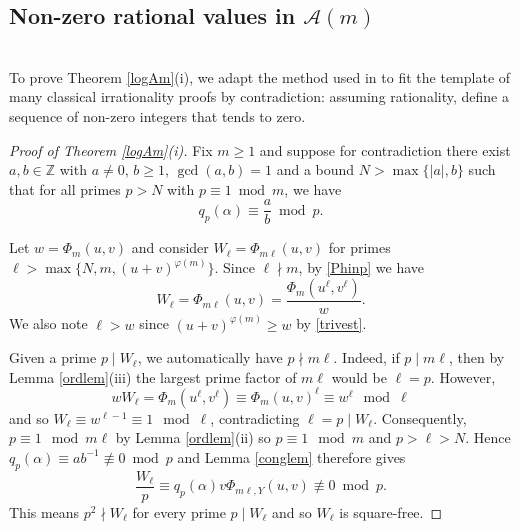 \documentclass[12pt,reqno]{amsart}
\theoremstyle{remark}
\newcommand{\cA}{\mathcal A}
\begin{document}
\subsection{Non-zero rational values in $\cA(m)$} $\,$\\[3pt]
To prove Theorem \ref{logAm}(i), we adapt the method used in \cite{MS26} to fit the template of many classical irrationality proofs by contradiction: assuming rationality, define a sequence of non-zero integers that tends to zero.
\begin{proof}[Proof of Theorem \ref{logAm}(i)] 
Fix $m\geq 1$ and suppose for contradiction there exist $a, b\in\mathbb{Z}$ with $a\neq 0$, $b\geq 1$, $\gcd(a,b)=1$ and a bound $N>\max\{|a|,b\}$ such that for all primes $p>N$ with $p\equiv 1\bmod m$,  we have
\[q_p(\alpha)\equiv \frac{a}{b}\bmod p.\] 
\vspace{-0.1cm}

\noindent
Let $w=\Phi_m(u,v)$ and consider $W_\ell=\Phi_{m\ell}(u,v)$ for primes $\ell>\max\{N, m, (u+v)^{\varphi(m)}\}$. 
Since $\ell\nmid m$, by \eqref{Phinp} we have  
\[W_\ell=\Phi_{m\ell}(u,v)=\frac{\Phi_m(u^\ell,v^\ell)}{w}.\]
We also note $\ell>w$ since $(u+v)^{\varphi(m)}\geq w$ by \eqref{trivest}.
\vspace{0.2cm}

Given a prime $p\mid W_\ell$, we automatically have $p\nmid m\ell$. Indeed, if $p\mid m\ell$, then by Lemma \ref{ordlem}(iii) the largest prime factor of $m\ell$ would be $\ell=p$. However, 
\[wW_\ell=\Phi_m(u^\ell,v^\ell)\equiv\Phi_m(u,v)^\ell\equiv w^\ell\mod\ell\]
and so $W_\ell\equiv w^{\ell-1}\equiv 1\mod\ell$, contradicting $\ell=p\mid W_\ell$. 
Consequently, $p\equiv 1\mod m\ell$ by Lemma \ref{ordlem}(ii) so $p\equiv 1\mod m$ and $p>\ell>N$.
Hence $q_p(\alpha)\equiv ab^{-1}\not\equiv 0\bmod p$ and Lemma \ref{conglem} therefore gives
\begin{equation*}\label{Wlcong}
\frac{W_\ell}{p}\equiv q_p(\alpha)v\Phi_{m\ell,Y}(u,v)\not\equiv 0\bmod p.
\end{equation*}
This means $p^2\nmid W_\ell$ for every prime $p\mid W_\ell$ and so $W_\ell$ is square-free.
\bigskip


\end{proof}
\end{document}
